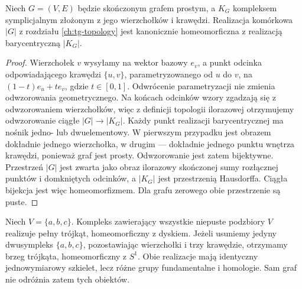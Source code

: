 \begin{stwierdzenie}
\label{prop:tg-graph-simplicial-realization}
Niech $G=(V,E)$ będzie skończonym grafem prostym,
a $K_G$ kompleksem symplicjalnym złożonym z jego
wierzchołków i krawędzi. Realizacja komórkowa $|G|$
z rozdziału \ref{ch:tg-topology} jest kanonicznie
homeomorficzna z realizacją barycentryczną $|K_G|$.
\end{stwierdzenie}
\begin{proof}
Wierzchołek $v$ wysyłamy na wektor bazowy $e_v$,
a punkt odcinka odpowiadającego krawędzi $\{u,v\}$,
parametryzowanego od $u$ do $v$, na $(1-t)e_u+te_v$,
gdzie $t\in[0,1]$. Odwrócenie parametryzacji nie
zmienia odwzorowania geometrycznego. Na końcach
odcinków wzory zgadzają się z odwzorowaniem
wierzchołków, więc z definicji topologii ilorazowej
otrzymujemy odwzorowanie ciągłe $|G|\to |K_G|$.
Każdy punkt realizacji barycentrycznej ma nośnik
jedno- lub dwuelementowy. W pierwszym przypadku
jest obrazem dokładnie jednego wierzchołka,
w drugim --- dokładnie jednego punktu wnętrza
krawędzi, ponieważ graf jest prosty. Odwzorowanie
jest zatem bijektywne. Przestrzeń $|G|$ jest zwarta
jako obraz ilorazowy skończonej sumy rozłącznej
punktów i domkniętych odcinków, a $|K_G|$ jest
przestrzenią Hausdorffa. Ciągła bijekcja jest więc
homeomorfizmem. Dla grafu zerowego obie przestrzenie
są puste.
\end{proof}

\begin{przyklad}
Niech $V=\{a,b,c\}$. Kompleks zawierający wszystkie niepuste
podzbiory $V$ realizuje pełny trójkąt, homeomorficzny z dyskiem.
Jeżeli usuniemy jedyny dwusympleks $\{a,b,c\}$, pozostawiając
wierzchołki i trzy krawędzie, otrzymamy brzeg trójkąta,
homeomorficzny z $S^1$. Obie realizacje mają identyczny
jednowymiarowy szkielet, lecz różne grupy fundamentalne
i homologie. Sam graf nie odróżnia zatem tych obiektów.
\end{przyklad}

